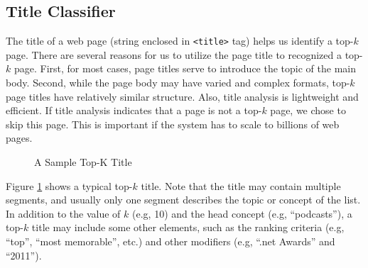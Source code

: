 \subsection{Title Classifier}
\label{sec:title}

The title of a web page (string enclosed in {\tt<title>} tag) helps us
identify a top-$k$ page.  There are several reasons for us to utilize
the page title to recognized a top-$k$ page.  First, for most cases,
page titles serve to introduce the topic of the main body.  Second,
while the page body may have varied and complex formats, top-$k$ page
titles have relatively similar structure.  Also, title analysis is
lightweight and efficient. If title analysis indicates that a page is
not a top-$k$ page, we chose to skip this page.
This is important if the system has to scale to billions of web pages.

\begin{figure}
\centering
{}
\caption{A Sample Top-K Title}
\label{fig:title}
\end{figure}

Figure \ref{fig:title} shows a typical top-$k$ title.  Note that the title
may contain multiple segments, and usually only one segment describes
the topic or concept of the list.  In addition to the value of $k$
(e.g, 10) and the head concept (e.g, ``podcasts''), a top-$k$ title
may include some other elements, such as the ranking criteria (e.g,
``top'', ``most memorable'', etc.) and other modifiers (e.g, ``.net
Awards'' and ``2011'').



